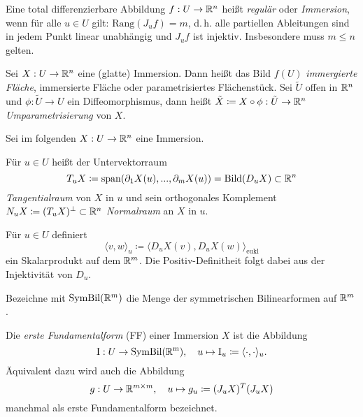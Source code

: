 \documentclass{cheat-sheet}
\newcommand{\I}{\mathrm{I}}
\newcommand{\Span}{\mathrm{span}}
\begin{document}

\begin{definition}
  Eine total differenzierbare Abbildung $f : U \to \mathbb{R}^n$ heißt \emph{regulär} oder \emph{Immersion}, wenn für alle $u \in U$ gilt: $\mathrm{Rang}(J_u f) = m$, d.\,h. alle partiellen Ableitungen sind in jedem Punkt linear unabhängig und $J_u f$ ist injektiv. Insbesondere muss $m \leq n$ gelten.
\end{definition}

\begin{definition}
  Sei $X : U \to \mathbb{R}^n$ eine (glatte) Immersion. Dann heißt das Bild $f(U)$ \emph{immergierte Fläche}, immersierte Fläche oder parametrisiertes Flächenstück. Sei $\tilde{U}$ offen in $\mathbb{R}^n$ und $\phi : \tilde{U} \to U$ ein Diffeomorphismus, dann heißt $\tilde{X} \coloneqq X \circ \phi : \tilde{U} \to \mathbb{R}^n$ \emph{Umparametrisierung} von $X$.
\end{definition}

\begin{nota}
  Sei im folgenden $X : U \to \mathbb{R}^n$ eine Immersion.
\end{nota}

\begin{definition}
  Für $u \in U$ heißt der Untervektorraum
  \[ T_u X \coloneqq \Span(\partial_1 X(u), ..., \partial_m X(u)) = \mathrm{Bild}(D_u X) \subset \R^n \]
  \emph{Tangentialraum} von $X$ in $u$ und sein orthogonales Komplement $N_u X \coloneqq (T_u X)^\perp \subset \mathbb{R}^n$ \emph{Normalraum} an $X$ in $u$.
\end{definition}

\begin{bem}
  Für $u \in U$ definiert
  \[ \langle v, w \rangle_u \coloneqq \langle D_u X(v), D_u X(w) \rangle_{\mathrm{eukl}} \]
  ein Skalarprodukt auf dem $\mathbb{R}^m$. Die Positiv-Definitheit folgt dabei aus der Injektivität von $D_u$.
\end{bem}

\begin{bem}
  Bezeichne mit $\mathrm{SymBil}(\mathbb{R}^m)$ die Menge der symmetrischen Bilinearformen auf $\mathbb{R}^m$.
\end{bem}

\begin{definition}
  Die \emph{erste Fundamentalform} (FF) einer Immersion $X$ ist die Abbildung
  \[ \I : U \to \mathrm{SymBil(\R^m)}, \quad u \mapsto \I_u \coloneqq \langle \cdot , \cdot \rangle_u. \]
  Äquivalent dazu wird auch die Abbildung
  \[ g : U \to \mathbb{R}^{m \times m}, \quad u \mapsto g_u \coloneqq (J_u X)^T (J_u X) \]
  manchmal als erste Fundamentalform bezeichnet.
\end{definition}
\end{document}
